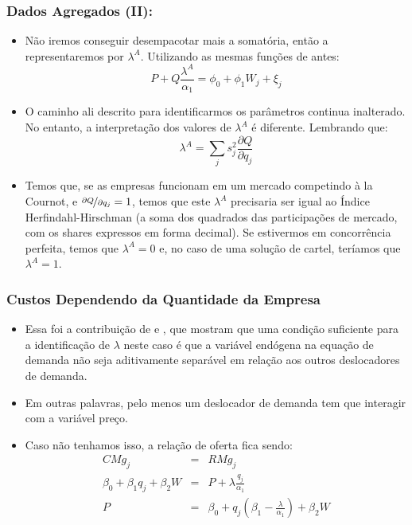 \documentclass{beamer}
\begin{document}
\begin{frame}\frametitle{Dados Agregados (II):}
\small
\begin{itemize}
\item Não iremos conseguir desempacotar mais a somatória,
então a representaremos por $\lambda^{A}$. Utilizando as mesmas funções
de antes:
\[
P+Q\frac{\lambda^{A}}{\alpha_{1}}=\phi_{0}+\phi_{1}W_{j}+\xi_{j}
\]
\item O caminho ali descrito para identificarmos os parâmetros
continua inalterado. No entanto, a interpretação dos valores de $\lambda^{A}$
é diferente. Lembrando que:
\[
\lambda^{A}=\sum_{j}s_{j}^{2}\frac{\partial Q}{\partial q_{j}}
\]
\item Temos que, se as empresas funcionam em um mercado
competindo à la Cournot, e $\nicefrac{\partial Q}{\partial q_{j}}=1$,
temos que este $\lambda^{A}$ precisaria ser igual ao Índice Herfindahl-Hirschman
(a soma dos quadrados das participações de mercado, com os shares
expressos em forma decimal). Se estivermos em concorrência perfeita,
temos que $\lambda^{A}=0$ e, no caso de uma solução de cartel, teríamos
que $\lambda^{A}=1$.
\end{itemize}
\end{frame}

\begin{frame}\frametitle{Custos Dependendo da Quantidade da Empresa}

\begin{itemize}
\item Essa foi a contribuição de \citet{Bresnahan1982a} e \citet{Lau1982a},
que mostram que uma condição suficiente para a identificação de $\lambda$
neste caso é que a variável endógena na equação de demanda não seja
aditivamente separável em relação aos outros deslocadores de demanda.
\item Em outras palavras, pelo menos um deslocador de demanda
tem que interagir com a variável preço.
\item Caso não tenhamos isso, a relação de oferta fica sendo:
\begin{eqnarray*}
CMg_{j} & = & RMg_{j}\\
\beta_{0}+\beta_{1}q_{j}+\beta_{2}W & = & P+\lambda\frac{q_{j}}{\alpha_{1}}\\
P & = & \beta_{0}+q_{j}\left(\beta_{1}-\frac{\lambda}{\alpha_{1}}\right)+\beta_{2}W
\end{eqnarray*}
\end{itemize}
\end{frame}
\end{document}
